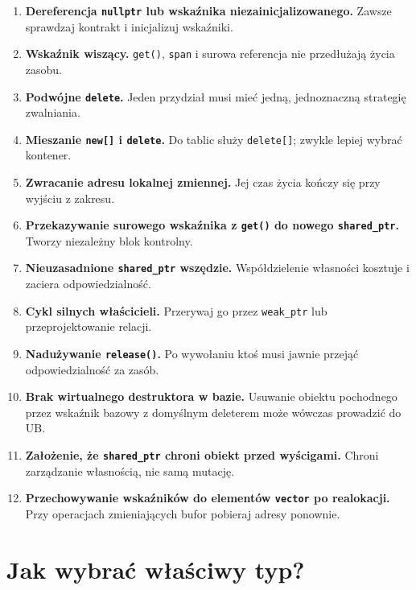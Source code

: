 \begin{enumerate}
    \item \textbf{Dereferencja \texttt{nullptr} lub wskaźnika
    niezainicjalizowanego.} Zawsze sprawdzaj kontrakt i inicjalizuj
    wskaźniki.
    \item \textbf{Wskaźnik wiszący.} \texttt{get()}, \texttt{span}
    i surowa referencja nie przedłużają życia zasobu.
    \item \textbf{Podwójne \texttt{delete}.} Jeden przydział musi mieć
    jedną, jednoznaczną strategię zwalniania.
    \item \textbf{Mieszanie \texttt{new[]} i \texttt{delete}.}
    Do tablic służy \texttt{delete[]}; zwykle lepiej wybrać kontener.
    \item \textbf{Zwracanie adresu lokalnej zmiennej.}
    Jej czas życia kończy się przy wyjściu z zakresu.
    \item \textbf{Przekazywanie surowego wskaźnika z \texttt{get()}
    do nowego \texttt{shared\_ptr}.} Tworzy niezależny blok kontrolny.
    \item \textbf{Nieuzasadnione \texttt{shared\_ptr} wszędzie.}
    Współdzielenie własności kosztuje i zaciera odpowiedzialność.
    \item \textbf{Cykl silnych właścicieli.} Przerywaj go przez
    \texttt{weak\_ptr} lub przeprojektowanie relacji.
    \item \textbf{Nadużywanie \texttt{release()}.} Po wywołaniu
    ktoś musi jawnie przejąć odpowiedzialność za zasób.
    \item \textbf{Brak wirtualnego destruktora w bazie.}
    Usuwanie obiektu pochodnego przez wskaźnik bazowy z domyślnym
    deleterem może wówczas prowadzić do UB.
    \item \textbf{Założenie, że \texttt{shared\_ptr} chroni obiekt
    przed wyścigami.} Chroni zarządzanie własnością, nie samą mutację.
    \item \textbf{Przechowywanie wskaźników do elementów \texttt{vector}
    po realokacji.} Przy operacjach zmieniających bufor pobieraj
    adresy ponownie.
\end{enumerate}

\section{Jak wybrać właściwy typ?}

